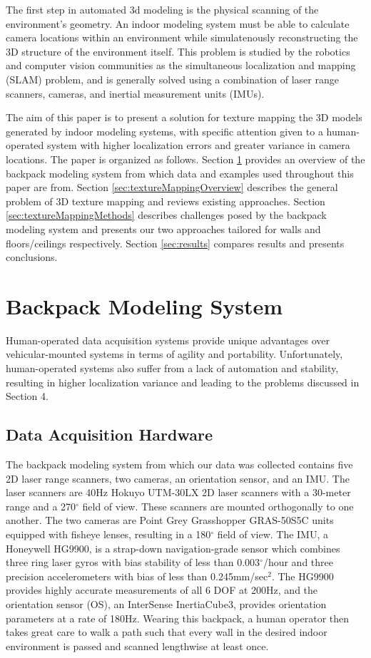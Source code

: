 \documentclass[10pt,twocolumn,letterpaper]{article}
\begin{document}
The first step in automated 3d modeling is the physical scanning of
the environment's geometry. An indoor modeling system must be able to
calculate camera locations within an environment while simulatenously
reconstructing the 3D structure of the environment itself. This
problem is studied by the robotics and computer vision communities as
the simultaneous localization and mapping (SLAM) problem, and is
generally solved using a combination of laser range scanners, cameras,
and inertial measurement units (IMUs).

The aim of this paper is to present a solution for texture mapping the
3D models generated by indoor modeling systems, with specific
attention given to a human-operated system with higher localization
errors and greater variance in camera locations. The paper is
organized as follows. Section \ref{sec:backpackSystem} provides an
overview of the backpack modeling system from which data and examples
used throughout this paper are from. Section
\ref{sec:textureMappingOverview} describes the general problem of 3D
texture mapping and reviews existing approaches. Section
\ref{sec:textureMappingMethods} describes challenges posed by the
backpack modeling system and presents our two approaches tailored for
walls and floors/ceilings respectively. Section \ref{sec:results} compares results and
presents conclusions.

\section{Backpack Modeling System}
\label{sec:backpackSystem}
Human-operated data acquisition systems provide unique advantages over vehicular-mounted systems in
terms of agility and portability. Unfortunately, human-operated systems also suffer from a lack of
automation and stability, resulting in higher localization variance
and leading to the problems discussed in Section 4.

\subsection{Data Acquisition Hardware}
The backpack modeling system from which our data was collected
contains five 2D laser range scanners, two cameras, an orientation
sensor, and an IMU. The laser
scanners are 40Hz Hokuyo UTM-30LX 2D laser scanners with a 30-meter
range and a 270$^{\circ}$ field of view. These scanners are mounted
orthogonally to one another. The two cameras are Point Grey
Grasshopper GRAS-50S5C units equipped with fisheye lenses, resulting
in a 180$^{\circ}$ field of view. The IMU, a Honeywell HG9900, is a
strap-down navigation-grade sensor which combines three ring laser
gyros with bias stability of less than 0.003$^{\circ}$/hour and three
precision accelerometers with bias of less than 0.245mm/sec$^{2}$. The
HG9900 provides highly accurate measurements of all 6 DOF at 200Hz, and the orientation sensor (OS), an InterSense InertiaCube3,
provides orientation parameters at a rate of 180Hz.
Wearing this backpack, a human operator then takes great care to walk a path such that every wall in the desired indoor environment is passed and scanned lengthwise at least once.
\end{document}
